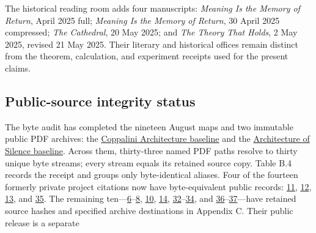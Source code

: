 The historical reading room adds four manuscripts: \emph{Meaning Is the Memory of Return}, April 2025 full; \emph{Meaning Is the Memory of Return}, 30 April 2025 compressed; \emph{The Cathedral}, 20 May 2025; and \emph{The Theory That Holds}, 2 May 2025, revised 21 May 2025. Their literary and historical offices remain distinct from the theorem, calculation, and experiment receipts used for the present claims.

\hypertarget{b.3.-public-source-integrity-status}{%
\subsection{Public-source integrity status}\label{b.3.-public-source-integrity-status}}

The byte audit has completed the nineteen August maps and two immutable public PDF archives: the \href{https://github.com/Coppalini-Architecture/coppalini-architecture/tree/9b7122ca5c3712c2c294e2bc5097276d0ba9817b}{Coppalini Architecture baseline} and the \href{https://github.com/lotuslift/The_Architecture_Of_Silence/tree/a525aff94cd625daa99d85b7840424f650834519}{Architecture of Silence baseline}. Across them, thirty-three named PDF paths resolve to thirty unique byte streams; every stream equals its retained source copy. Table B.4 records the receipt and groups only byte-identical aliases. Four of the fourteen formerly private project citations now have byte-equivalent public records: \href{https://github.com/Coppalini-Architecture/coppalini-architecture/blob/9b7122ca5c3712c2c294e2bc5097276d0ba9817b/papers/10\%20THERMODYNAMICS_The_Typed_Root_of_Entropy_v0_2.md}{11}, \href{https://github.com/Coppalini-Architecture/coppalini-architecture/blob/9b7122ca5c3712c2c294e2bc5097276d0ba9817b/papers/13\%20MEMBRANE_MITOCHONDRIA_CHEMIOSMOSIS_ATP_METABOLIC_CONTROL_v0_1.md}{12}, \href{https://github.com/Coppalini-Architecture/coppalini-architecture/blob/9b7122ca5c3712c2c294e2bc5097276d0ba9817b/papers/14\%20DNA_REPLICATION_REPAIR_EXPRESSION_HEREDITARY_MEMORY_v0_1.md}{13}, and \href{https://github.com/Coppalini-Architecture/coppalini-architecture/blob/9b7122ca5c3712c2c294e2bc5097276d0ba9817b/papers/metric-mirror-symmetry-riemanns-i-machine/metric-mirror-symmetry-riemanns-i-machine-2026-09-09.pdf}{35}. The remaining ten---\href{https://chatgpt.com/library?file_id=libfile_5aa28715b83881919460603dea30bc25\&account_id=personal}{6}--\href{https://chatgpt.com/library?file_id=libfile_67018da506648191b88970078f33fd1a\&account_id=personal}{8}, \href{https://chatgpt.com/library?file_id=libfile_37ba8f1902d88191a1ecc5aa2a9514dd\&account_id=personal}{10}, \href{https://chatgpt.com/library?file_id=libfile_c45a658f83988191a4057b320f6b5048\&account_id=personal}{14}, \href{https://chatgpt.com/library?file_id=libfile_d247e341311c8191bb1c0aefc5af4111\&account_id=personal}{32}--\href{https://chatgpt.com/library?file_id=libfile_5167b051c248819185f3673cbcb6537d\&account_id=personal}{34}, and \href{https://chatgpt.com/library?file_id=libfile_c8b01c25977c8191821c6dddbe16e0da\&account_id=personal}{36}--\href{https://chatgpt.com/library?file_id=libfile_b30993b2ecd48191aab2855fdb3d932e\&account_id=personal}{37}---have retained source hashes and specified archive destinations in Appendix C. Their public release is a separate 